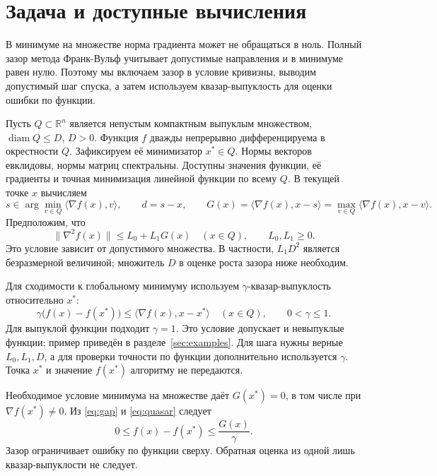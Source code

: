 \section{Задача и доступные вычисления}
В минимуме на множестве норма градиента может не обращаться в ноль.
Полный зазор метода Франк-Вульф учитывает допустимые направления
и в минимуме равен нулю. Поэтому мы включаем зазор в условие
кривизны, выводим допустимый шаг спуска, а затем используем
квазар-выпуклость для оценки ошибки по функции.

Пусть $Q\subset\mathbb R^n$ является непустым компактным выпуклым
множеством, $\operatorname{diam}Q\le D$, $D>0$. Функция $f$
дважды непрерывно дифференцируема в окрестности $Q$.
Зафиксируем её минимизатор $x^*\in Q$. Нормы векторов евклидовы,
нормы матриц спектральны. Доступны значения функции, её градиенты
и точная минимизация линейной функции по всему $Q$.
В текущей точке $x$ вычисляем
\begin{equation}\label{eq:gap}
 s\in\arg\min_{v\in Q}\langle\nabla f(x),v\rangle,\qquad
 d=s-x,\qquad
 G(x)=\langle\nabla f(x),x-s\rangle
     =\max_{v\in Q}\langle\nabla f(x),x-v\rangle.
\end{equation}
Предположим, что
\begin{equation}\label{eq:gap_smoothness}
 \|\nabla^2f(x)\|\le L_0+L_1G(x)\quad(x\in Q),
 \qquad L_0,L_1\ge0.
\end{equation}
Это условие зависит от допустимого множества. В частности,
$L_1D^2$ является безразмерной величиной; множитель $D$ в оценке
роста зазора ниже необходим.

Для сходимости к глобальному минимуму используем
$\gamma$-квазар-выпуклость относительно $x^*$:
\begin{equation}\label{eq:quasar}
 \gamma\bigl(f(x)-f(x^*)\bigr)
       \le\langle\nabla f(x),x-x^*\rangle\quad(x\in Q),
 \qquad 0<\gamma\le1.
\end{equation}
Для выпуклой функции подходит $\gamma=1$. Это условие допускает
и невыпуклые функции; пример приведён в разделе~\ref{sec:examples}.
Для шага нужны верные $L_0,L_1,D$, а для проверки точности по
функции дополнительно используется $\gamma$. Точка $x^*$ и
значение $f(x^*)$ алгоритму не передаются.

Необходимое условие минимума на множестве даёт $G(x^*)=0$,
в том числе при $\nabla f(x^*)\ne0$.
Из \eqref{eq:gap} и \eqref{eq:quasar} следует
\begin{equation}\label{eq:certificate}
 0\le f(x)-f(x^*)\le \frac{G(x)}{\gamma}.
\end{equation}
Зазор ограничивает ошибку по функции сверху. Обратная оценка
из одной лишь квазар-выпуклости не следует.

